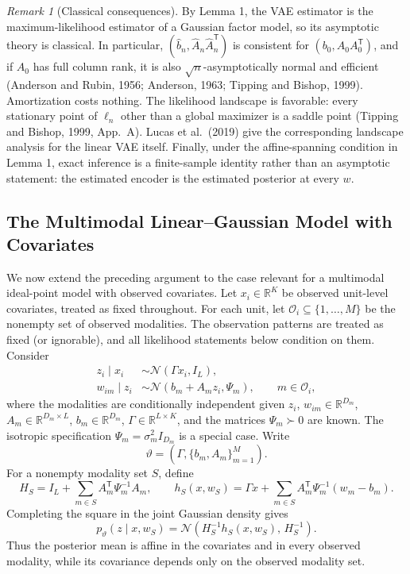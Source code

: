 \documentclass[11pt]{article}
\newcommand{\R}{\mathbb{R}}
\newcommand{\N}{\mathcal{N}}
\newcommand{\trans}{\mathsf{T}}
\theoremstyle{remark}
\newtheorem{remark}{Remark}
\begin{document}
\begin{remark}[Classical consequences]
By Lemma 1, the VAE estimator is the maximum-likelihood estimator of a Gaussian factor model, so its asymptotic theory is classical. In particular,
$(\widehat b_n,\widehat A_n\widehat A_n^\trans)$ is consistent for
$(b_0,A_0A_0^\trans)$, and if $A_0$ has full column rank, it is also
$\sqrt n$-asymptotically normal and efficient (Anderson and Rubin, 1956; Anderson, 1963; Tipping and Bishop, 1999). Amortization costs nothing. The likelihood landscape is favorable: every stationary point of $\ell_n$ other than a global maximizer is a saddle point (Tipping and Bishop, 1999, App.~A). Lucas et al.\ (2019) give the corresponding landscape analysis for the linear VAE itself. Finally, under the affine-spanning condition in Lemma 1, exact inference is a finite-sample identity rather than an asymptotic statement: the estimated encoder is the estimated posterior at every $w$.
\end{remark}

\subsection{The Multimodal Linear--Gaussian Model with Covariates}

We now extend the preceding argument to the case relevant for a multimodal ideal-point model with observed covariates. Let $x_i\in\R^K$ be observed unit-level covariates, treated as fixed throughout. For each unit, let $\mathcal{O}_i\subseteq\{1,\ldots,M\}$ be the nonempty set of observed modalities. The observation patterns are treated as fixed (or ignorable), and all likelihood statements below condition on them. Consider
\begin{equation}
\begin{aligned}
z_i\mid x_i
&\sim \N(\Gamma x_i,I_L),\\
w_{im}\mid z_i
&\sim \N(b_m+A_mz_i,\Psi_m),
\qquad m\in\mathcal{O}_i,
\end{aligned}
\tag{6}
\end{equation}
where the modalities are conditionally independent given $z_i$,
$w_{im}\in\R^{D_m}$,
$A_m\in\R^{D_m\times L}$,
$b_m\in\R^{D_m}$,
$\Gamma\in\R^{L\times K}$, and the matrices $\Psi_m\succ0$ are known. The isotropic specification $\Psi_m=\sigma_m^2I_{D_m}$ is a special case. Write
\[
\vartheta=\left(\Gamma,\{b_m,A_m\}_{m=1}^M\right).
\]
For a nonempty modality set $S$, define
\begin{equation}
H_S
=
I_L+\sum_{m\in S}A_m^\trans\Psi_m^{-1}A_m,
\qquad
h_S(x,w_S)
=
\Gamma x+\sum_{m\in S}A_m^\trans\Psi_m^{-1}(w_m-b_m).
\tag{7}
\end{equation}
Completing the square in the joint Gaussian density gives
\begin{equation}
p_\vartheta(z\mid x,w_S)
=
\N\!\left(H_S^{-1}h_S(x,w_S),\,H_S^{-1}\right).
\tag{8}
\end{equation}
Thus the posterior mean is affine in the covariates and in every observed modality, while its covariance depends only on the observed modality set.
\end{document}
